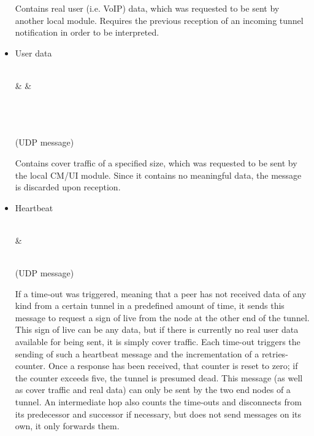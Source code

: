 \documentclass{article}
\begin{document}
\begin{itemize}
	Contains real user (i.e. VoIP) data, which was requested to be sent by another local module. Requires the previous reception of an incoming tunnel notification in order to be interpreted.
	
	\item User data \\
	
		\begin{bytefield}[bitwidth=1.0em]{32}
			 \\
			& 
			&  \\
			 \\
			\skippedwords \\	
		\end{bytefield} \\
		(UDP message)
		
		Contains cover traffic of a specified size, which was requested to be sent by the local CM/UI module. Since it contains no meaningful data, the message is discarded upon reception.
		
	\item Heartbeat \\
	
	\begin{bytefield}[bitwidth=1.0em]{32}
		\bitheader{0,7} \\
		& \bitbox{8}{HEARTBEAT}
	\end{bytefield} \\
	(UDP message)
	
	If a time-out was triggered, meaning that a peer has not received data of any kind from a certain tunnel in a predefined amount of time, it sends this message to request a sign of live from the node at the other end of the tunnel. This sign of live can be any data, but if there is currently no real user data available for being sent, it is simply cover traffic.
	Each time-out triggers the sending of such a heartbeat message and the incrementation of a retries-counter. Once a response has been received, that counter is reset to zero; if the counter exceeds five, the tunnel is presumed dead. This message (as well as cover traffic and real data) can only be sent by the two end nodes of a tunnel. An intermediate hop also counts the time-outs and disconnects from its predecessor and successor if necessary, but does not send messages on its own, it only forwards them.
\end{itemize}
	
\end{document}
